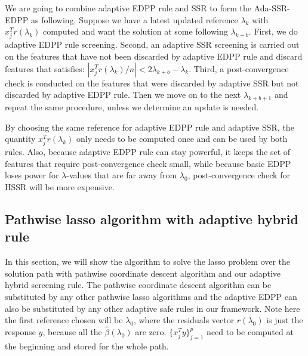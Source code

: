 We are going to combine adaptive EDPP rule and SSR to form the Ada-SSR-EDPP as following. Suppose we have a latest updated reference $\lambda_k$ with $x_j^Tr(\lambda_k)$ computed and want the solution at some following $\lambda_{k+b}$. First, we do adaptive EDPP rule screening. Second, an adaptive SSR screening is carried out on the features that have not been discarded by adaptive EDPP rule and discard features that satisfies: $|x_j^Tr(\lambda_k)/n|<2\lambda_{k+b}-\lambda_k$. Third, a post-convergence check is conducted on the features that were discarded by adaptive SSR but not discarded by adaptive EDPP rule. Then we move on to the next $\lambda_{k+b+1}$ and repeat the same procedure, unless we determine an update is needed.

By choosing the same reference for adaptive EDPP rule and adaptive SSR, the quantity $x_j^Tr(\lambda_k)$ only needs to be computed once and can be used by both rules. Also, because adaptive EDPP rule can stay powerful, it keeps the set of features that require post-convergence check small, while because basic EDPP loses power for $\lambda$-values that are far away from $\lambda_0$, post-convergence check for HSSR will be more expensive.

\subsection{Pathwise lasso algorithm with adaptive hybrid rule}

In this section, we will show the algorithm to solve the lasso problem over the solution path with pathwise coordinate descent algorithm and our adaptive hybrid screening rule. The pathwise coordinate descent algorithm can be substituted by any other pathwise lasso algorithms and the adaptive EDPP can also be substituted by any other adaptive safe rules in our framework. Note here the first reference chosen will be $\lambda_0$, where the residuals vector $r(\lambda_0)$ is just the response $y$, because all the $\hat{\beta}(\lambda_0)$ are zero. $\{x_j^Ty\}_{j=1}^p$ need to be computed at the beginning and stored for the whole path.

